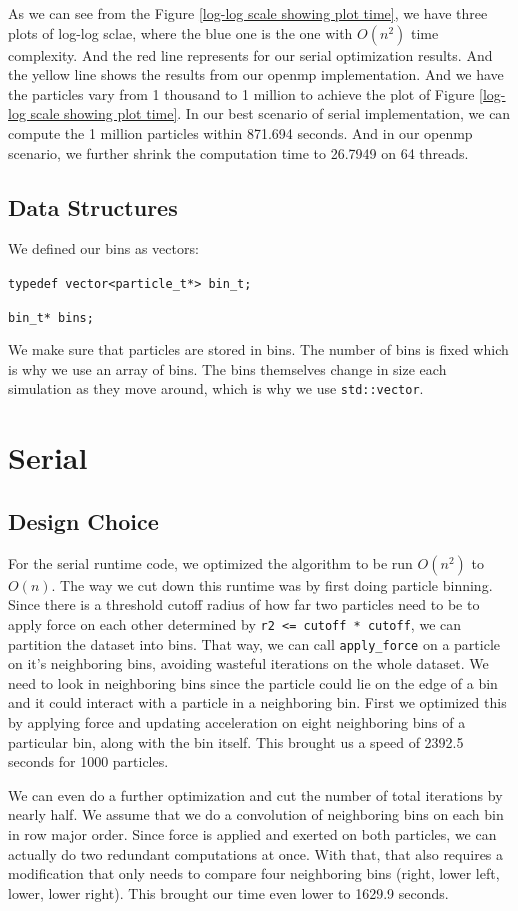 \documentclass{article}
\begin{document}
As we can see from the Figure \ref{log-log scale showing plot time}, we have three plots of log-log sclae, where the blue one is the one with $O(n^{2})$ time complexity. And the red line represents for our serial optimization results. And the yellow line shows the results from our openmp implementation. And we have the particles vary from 1 thousand to 1 million to achieve the plot of Figure \ref{log-log scale showing plot time}. In our best scenario of serial implementation, we can compute the 1 million particles within 871.694 seconds. And in our openmp scenario, we further shrink the computation time to 26.7949 on 64 threads.

\subsection{Data Structures}
We defined our bins as vectors:

\verb|typedef vector<particle_t*> bin_t;|

\verb|bin_t* bins;|

We make sure that particles are stored in bins. The number of bins is fixed which is why we use an array of bins. The bins themselves
change in size each simulation as they move around, which is why we use \verb|std::vector|.
\section{Serial}

\subsection{Design Choice}
For the serial runtime code, we optimized the algorithm to be run $O(n^2)$ to $O(n)$. The way we cut down this runtime was by first doing particle binning. Since there is a threshold cutoff radius of how far two particles need to be to apply force on each other determined by \verb|r2 <= cutoff * cutoff|, we can partition the dataset into bins. That way, we can call \verb|apply_force| on a particle on it's neighboring bins, avoiding wasteful iterations on the whole dataset. We need to look in neighboring bins since the particle could lie on the edge of a bin and it could interact with a particle in a neighboring bin. First we optimized this by applying force and updating acceleration on eight neighboring bins of a particular bin, along with the bin itself. 
This brought us a speed of 2392.5 seconds for 1000 particles.

We can even do a further optimization and cut the number of total iterations by nearly half. We assume that we do a convolution of neighboring bins on each bin in row major order. Since force is applied and exerted on both particles, we can actually do two redundant computations at once. With that, that also requires a modification that only needs to compare four neighboring bins (right, lower left, lower, lower right). This brought our time even lower to 1629.9 seconds.
\end{document}
